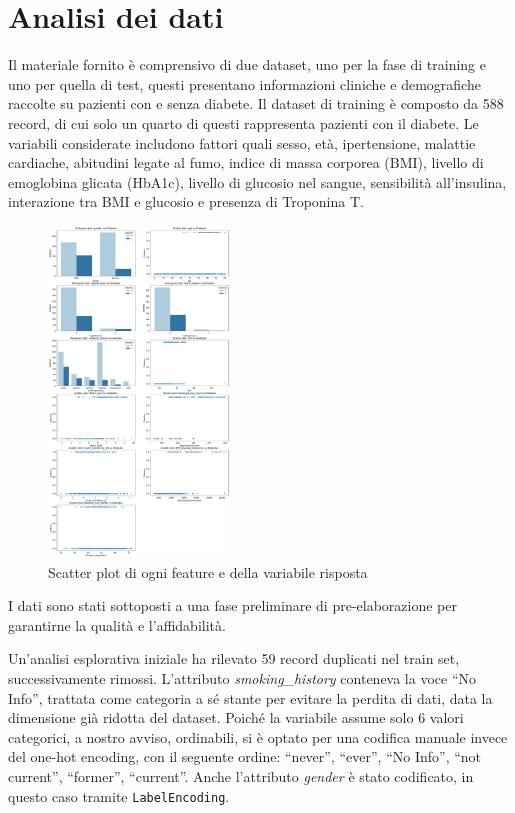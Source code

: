 \documentclass[conference]{IEEEtran}
\begin{document}
\section{Analisi dei dati}
Il materiale fornito è comprensivo di due dataset, uno per la fase di training e uno per quella di test, questi presentano informazioni cliniche e demografiche raccolte su pazienti con e senza diabete. Il dataset di training è composto da 588 record, di cui solo un quarto di questi rappresenta pazienti con il diabete. Le variabili considerate includono fattori quali sesso, età, ipertensione, malattie cardiache, abitudini legate al fumo, indice di massa corporea (BMI), livello di emoglobina glicata (HbA1c), livello di glucosio nel sangue, sensibilità all’insulina, interazione tra BMI e glucosio e presenza di Troponina T. 

\begin{figure}[htbp]
    \centering
    \includegraphics[width=0.43\textwidth]{features_vs_diabetes.pdf}
    \caption{Scatter plot di ogni feature e della variabile risposta}
    \label{features}
\end{figure}

I dati sono stati sottoposti a una fase preliminare di pre-elaborazione per garantirne la qualità e l’affidabilità.

Un'analisi esplorativa iniziale ha rilevato 59 record duplicati nel train set, successivamente rimossi. L’attributo \emph{smoking\_history} conteneva la voce “No Info”, trattata come categoria a sé stante per evitare la perdita di dati, data la dimensione già ridotta del dataset. Poiché la variabile assume solo 6 valori categorici, a nostro avviso, ordinabili, si è optato per una codifica manuale invece del one-hot encoding, con il seguente ordine: “never”, “ever”, “No Info”, “not current”, “former”, “current”. Anche l’attributo \emph{gender} è stato codificato, in questo caso tramite \texttt{LabelEncoding}.
\end{document}
